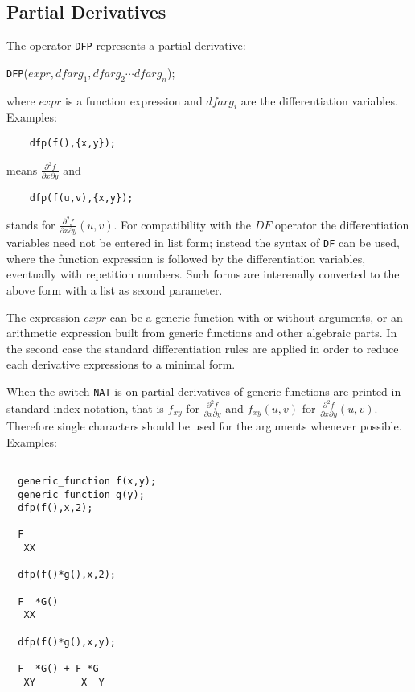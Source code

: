 \subsection{Partial Derivatives}

The operator {\tt DFP} represents a partial derivative:

\vspace{.1in}
 {\tt DFP}($expr,{dfarg_1,dfarg_2\cdots dfarg_n}$);
\vspace{.1in}

\noindent
where $expr$ is a function expression and $dfarg_i$ are
the differentiation variables. Examples:

\begin{verbatim}
    dfp(f(),{x,y});
\end{verbatim}
means $\frac{\partial ^2 f}{\partial x \partial y}$ and
\begin{verbatim}
    dfp(f(u,v),{x,y});
\end{verbatim}
stands for $\frac{\partial ^2 f}{\partial x \partial y} (u,v)$.
For compatibility with the $DF$ operator the differentiation
variables need not be entered in list form; instead the syntax
of {\tt DF} can be used, where the function expression is followed
by the differentiation variables, eventually with repetition
numbers. Such forms are interenally converted to the above
form with a list as second parameter.

The expression $expr$ can be a generic function
with or without arguments, or an arithmetic expression built
from generic functions and other algebraic parts. In the
second case the standard differentiation rules are applied
in order to reduce each derivative expressions to a minimal
form.

When the switch {\tt NAT} is on partial derivatives of generic
functions are printed in standard index notation, that is
$f_{xy}$ for $\frac{\partial ^2 f}{\partial x \partial y}$
and $f_{xy}(u,v)$ for $\frac{\partial ^2 f}{\partial x \partial y}(u,v)$.
Therefore single characters should be used for the arguments
whenever possible. Examples:

\begin{verbatim}

  generic_function f(x,y);
  generic_function g(y);
  dfp(f(),x,2);

  F
   XX

  dfp(f()*g(),x,2);

  F  *G()
   XX

  dfp(f()*g(),x,y);

  F  *G() + F *G
   XY        X  Y

\end{verbatim}


